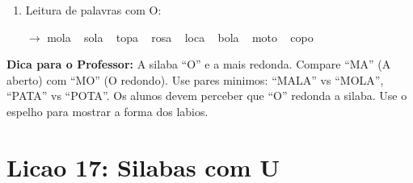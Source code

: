 \begin{exercicio}
\begin{enumerate}[resume]
  \item Leitura de palavras com O:
  \begin{center}
  $\rightarrow$ mola  ~  sola  ~  topa  ~  rosa  ~  loca  ~  bola  ~  moto  ~  copo
  \end{center}
\end{enumerate}
\end{exercicio}

\begin{dica}
\textbf{Dica para o Professor:} A silaba ``O'' e a mais redonda. Compare ``MA'' (A aberto) com ``MO'' (O redondo). Use pares minimos: ``MALA'' vs ``MOLA'', ``PATA'' vs ``POTA''. Os alunos devem perceber que ``O'' redonda a silaba. Use o espelho para mostrar a forma dos labios.
\end{dica}

\section{Licao 17: Silabas com U}

\rotinasimples
{}



